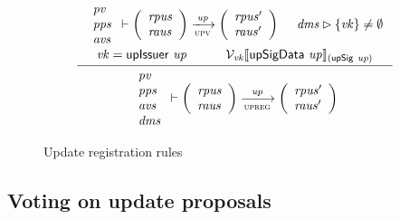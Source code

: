 \begin{figure}[htb]
  \begin{equation}
    \label{eq:rule:up-registration}
    \inference
    {
      {
        \begin{array}{l}
          \var{pv}\\
          \var{pps}\\
          \var{avs}
        \end{array}
      }
      \vdash
      {
        \left(
          \begin{array}{l}
            \var{rpus}\\
            \var{raus}\\
          \end{array}
        \right)
      }
      \trans{upv}{\var{up}}
      {
        \left(
          \begin{array}{l}
            \var{rpus'}\\
            \var{raus'}\\
          \end{array}
        \right)
      }
      &
      \var{dms} \restrictrange \{\var{vk}\} \neq \emptyset\\
      \var{vk} = \upIssuer{up} &
      \mathcal{V}_{\var{vk}}\serialised{\upSigData{up}}_{(\upSig{up})}
    }
    {
      {
        \begin{array}{l}
          \var{pv}\\
          \var{pps}\\
          \var{avs}\\
          \var{dms}
        \end{array}
      }
      \vdash
      {
        \left(
          \begin{array}{l}
            \var{rpus}\\
            \var{raus}
          \end{array}
        \right)
      }
      \trans{upreg}{\var{up}}
      {
        \left(
          \begin{array}{l}
            \var{rpus'}\\
            \var{raus'}
          \end{array}
        \right)
      }
    }
  \end{equation}
  \caption{Update registration rules}
  \label{fig:rules:up-registration}
\end{figure}

\clearpage

\subsection{Voting on update proposals}
\label{sec:voting-on-update-proposals}


